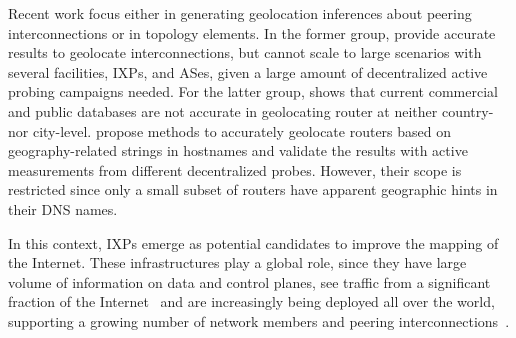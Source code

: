 	Recent work focus either in generating geolocation inferences about peering interconnections or in topology elements. In the former group, \cite{Giotsas:2015:MPI:2716281.2836122, Augustin:2009:IM:1644893.1644934} provide accurate results to geolocate interconnections, but cannot scale to large scenarios with several facilities, IXPs, and ASes, given a large amount of decentralized active probing campaigns needed. For the latter group, \cite{Gharaibeh:2017:LRG:3131365.3131380} shows that current commercial and public databases are not accurate in geolocating router at neither country- nor city-level. \cite{Huffaker:2014:DDR:2656877.2656879, 8002903} propose methods to accurately geolocate routers based on geography-related strings in hostnames and validate the results with active measurements from different decentralized probes. However, their scope is restricted since only a small subset of routers have apparent geographic hints in their DNS names.

	In this context, IXPs emerge as potential candidates to improve the mapping of the Internet. These infrastructures play a global role, since they have large volume of information on data and control planes, see traffic from a significant fraction of the Internet~\cite{Chatzis:2013:BUL:2504730.2504746} and are increasingly being deployed all over the world, supporting a growing number of network members and peering interconnections~\cite{Giotsas:2017:DPI:3098822.3098855}.
	


